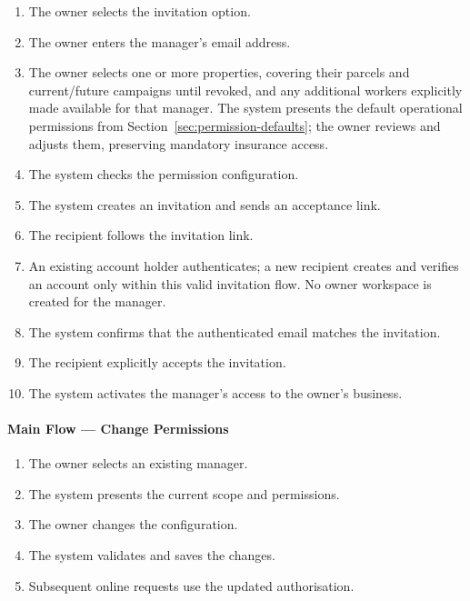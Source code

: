 \begin{enumerate}
        \item The owner selects the invitation option.
        \item The owner enters the manager's email address.
        \item The owner selects one or more properties, covering their parcels and current/future campaigns until revoked, and any additional workers explicitly made available for that manager. The system presents the default operational permissions from Section~\ref{sec:permission-defaults}; the owner reviews and adjusts them, preserving mandatory insurance access.
        \item The system checks the permission configuration.
        \item The system creates an invitation and sends
        an acceptance link.
        \item The recipient follows the invitation link.
        \item An existing account holder authenticates;
        a new recipient creates and verifies an account only within this valid invitation flow. No owner workspace is created for the manager.
        \item The system confirms that the authenticated
        email matches the invitation.
        \item The recipient explicitly accepts the invitation.
        \item The system activates the manager's access
        to the owner's business.
    \end{enumerate}

\paragraph{Main Flow --- Change Permissions}

\begin{enumerate}
        \item The owner selects an existing manager.
        \item The system presents the current scope
        and permissions.
        \item The owner changes the configuration.
        \item The system validates and saves the changes.
        \item Subsequent online requests use the updated
        authorisation.
    \end{enumerate}


